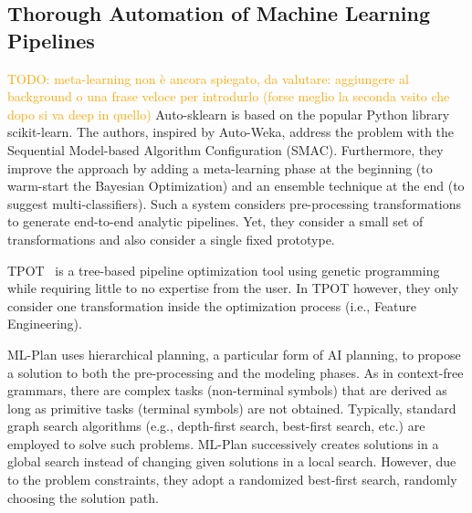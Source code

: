 \subsection{Thorough Automation of Machine Learning Pipelines}
\label{effective-ssec:dpso-cash}
\textcolor{orange}{TODO: meta-learning non è ancora spiegato, da valutare: aggiungere al background o una frase veloce per introdurlo (forse meglio la seconda vsito che dopo si va deep in quello)}
Auto-sklearn \cite{Feurer15AutoSklearn} is based on the popular Python library scikit-learn.
The authors, inspired by Auto-Weka, address the problem with the Sequential Model-based Algorithm Configuration (SMAC).
Furthermore, they improve the approach by adding a meta-learning phase at the beginning (to warm-start the Bayesian Optimization) and an ensemble technique at the end (to suggest multi-classifiers).
Such a system considers pre-processing transformations to generate end-to-end analytic pipelines.
Yet, they consider a small set of transformations and also consider a single fixed prototype.

TPOT~\cite{Olson16Tpot} is a tree-based pipeline optimization tool using genetic programming while requiring little to no expertise from the user.
In TPOT however, they only consider one transformation inside the optimization process (i.e., Feature Engineering).

ML-Plan \cite{mohr2018ml} uses hierarchical planning, a particular form of AI planning, to propose a solution to both the pre-processing and the modeling phases.
As in context-free grammars, there are complex tasks (non-terminal symbols) that are derived as long as primitive tasks (terminal symbols) are not obtained.
Typically, standard graph search algorithms (e.g., depth-first search, best-first search, etc.) are employed to solve such problems.
ML-Plan successively creates solutions in a global search instead of changing given solutions in a local search. However, due to the problem constraints, they adopt a randomized best-first search, randomly choosing the solution path.

